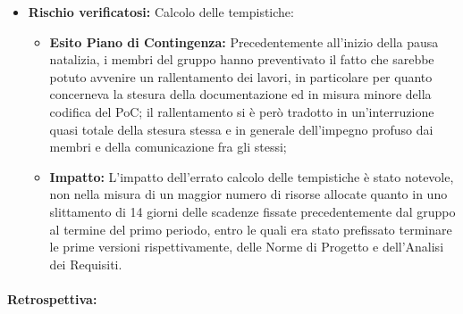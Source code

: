 \begin{itemize}
\item \textbf{Rischio verificatosi:} Calcolo delle tempistiche:
\begin{itemize}
    \item \textbf{Esito Piano di Contingenza:} Precedentemente all'inizio della pausa natalizia, i membri del gruppo hanno preventivato il fatto che sarebbe potuto avvenire un rallentamento dei lavori, in particolare per quanto concerneva la stesura della documentazione ed in misura minore della codifica del PoC; il rallentamento si è però tradotto in un'interruzione quasi totale della stesura stessa e in generale dell'impegno profuso dai membri e della comunicazione fra gli stessi;
    \item \textbf{Impatto:} L'impatto dell'errato calcolo delle tempistiche è stato notevole, non nella misura di un maggior numero di risorse allocate quanto in uno slittamento di 14 giorni delle scadenze fissate precedentemente dal gruppo al termine del primo periodo, entro le quali era stato prefissato terminare le prime versioni rispettivamente, delle Norme di Progetto e dell'Analisi dei Requisiti.
\end{itemize}
\end{itemize}

\paragraph{}
\textbf{Retrospettiva:}

